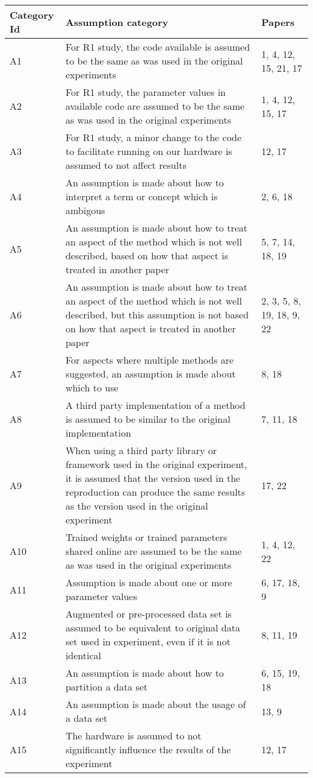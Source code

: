 \begin{tabularx}{\textwidth}{lXl}
\toprule
Category Id &                                                                                                                                                                                                 Assumption category &                     Papers \\
\midrule
 A1 &  For R1 study, the code available is assumed to be the same as was used in the original experiments &  1, 4, 12, 15, 21, 17 \\
 A2 &  For R1 study, the parameter values in available code are assumed to be the same as was used in the original experiments &  1, 4, 12, 15, 17 \\
 A3 &  For R1 study, a minor change to the code to facilitate running on our hardware is assumed to not affect results &  12, 17 \\
 A4 &  An assumption is made about how to interpret a term or concept which is ambigous &  2, 6, 18 \\
 A5 &  An assumption is made about how to treat an aspect of the method which is not well described, based on how that aspect is treated in another paper &  5, 7, 14, 18, 19 \\
 A6 &  An assumption is made about how to treat an aspect of the method which is not well described, but this assumption is not based on how that aspect is treated in another paper &  2, 3, 5, 8, 19, 18, 9, 22 \\
 A7 &  For aspects where multiple methods are suggested, an assumption is made about which to use &  8, 18 \\
 A8 &  A third party implementation of a method is assumed to be similar to the original implementation &  7, 11, 18 \\
 A9 &  When using a third party library or framework used in the original experiment, it is assumed that the version used in the reproduction can produce the same results as the version used in the original experiment &  17, 22 \\
 A10 &  Trained weights or trained parameters shared online are assumed to be the same as was used in the original experiments &  1, 4, 12, 22 \\
 A11 &  Assumption is made about one or more parameter values &  6, 17, 18, 9 \\
 A12 &  Augmented or pre-processed data set is assumed to be equivalent to original data set used in experiment, even if it is not identical &  8, 11, 19 \\
 A13 &  An assumption is made about how to partition a data set  &  6, 15, 19, 18 \\
 A14 &  An assumption is made about the usage of a data set &  13, 9 \\
 A15 &  The hardware is assumed to not significantly influence the results of the experiment &  12, 17 \\
\bottomrule
\end{tabularx}
